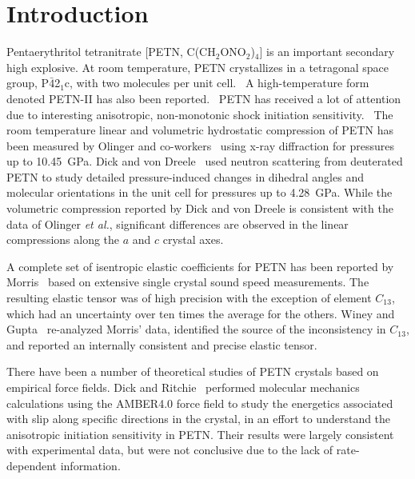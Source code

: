 \documentclass[prb,aps,nobibnotes,twocolumn,doublespace,twocolumngrid,superbib]{revtex4}
\begin{document}
\section{Introduction}
Pentaerythritol tetranitrate [PETN, C(CH$_2$ONO$_2$)$_4$] is an
important secondary high explosive.  At room temperature, PETN
crystallizes in a tetragonal space group, P$\bar{4}$2$_1$c, with two
molecules per unit
cell.~\cite{Booth_1947v,Trotter_1963v16,Conant_1979} A
high-temperature form denoted PETN-II has also been
reported.~\cite{Cady_1975vB41} PETN has received a lot of attention
due to interesting anisotropic, non-monotonic shock initiation
sensitivity.~\cite{Dick_1984v44,Dick_1991v70,Gallagher_1992v339,Dick_1997v81,Gruzdkov_2000v104,Yoo_2000v88}
The room temperature linear and volumetric hydrostatic compression of
PETN has been measured by Olinger and
co-workers~\cite{Olinger_1975v62,Olinger_1976} using x-ray diffraction
for pressures up to 10.45~GPa.  Dick and von Dreele~\cite{Dick_1997}
used neutron scattering from deuterated PETN to study detailed
pressure-induced changes in dihedral angles and molecular orientations
in the unit cell for pressures up to 4.28~GPa.
While the volumetric compression reported by Dick and von Dreele is
consistent with the data of Olinger {\it et al.}, significant
differences are observed in the linear compressions along the $a$ and
$c$ crystal axes.

A complete set of isentropic elastic coefficients for PETN has been
reported by Morris~\cite{Morris_1976} based on extensive single
crystal sound speed measurements.  The resulting elastic tensor was of
high precision with the exception of element $C_{13}$, which had an
uncertainty over ten times the average for the others.  Winey and
Gupta~\cite{Winey_2001v90} re-analyzed Morris' data, identified the
source of the inconsistency in $C_{13}$, and reported an internally
consistent and precise elastic tensor.

There have been a number of theoretical studies of PETN crystals based
on empirical force fields.  Dick and
Ritchie~\cite{Dick_1994v76} performed molecular mechanics calculations
using the AMBER4.0 force field to study the energetics associated with
slip along specific directions in the crystal, in an effort to
understand the anisotropic initiation sensitivity in PETN.  Their
results were largely consistent with experimental data, but were not
conclusive due to the lack of rate-dependent information.
\end{document}
